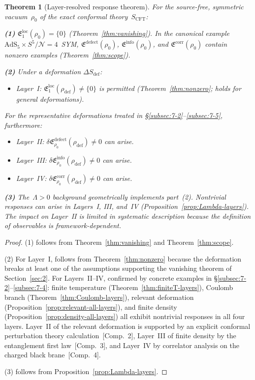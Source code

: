 \documentclass[
  aps,
  prd,
  preprint,
  groupedaddress,
  nofootinbib,
  longbibliography
]{revtex4-2}
\newtheorem{theorem}[definition]{Theorem}
\theoremstyle{remark}
\newcommand{\N}{\mathcal{N}}
\newcommand{\AdS}{\mathrm{AdS}}
\begin{document}
\begin{theorem}[Layer-resolved response theorem]%
  \label{thm:layer-response}
For the source-free, symmetric vacuum~$\rho_0$ of the exact
conformal theory~$S_{\mathrm{CFT}}$:

\textbf{(1)}
$\mathfrak{E}_1^{\mathrm{loc}}(\rho_0)=\{0\}$
(Theorem~\ref{thm:vanishing}).
In the canonical
example~$\AdS_5\times S^5/\N=4$~SYM,
$\mathfrak{E}^{\mathrm{defect}}(\rho_0)$,
$\mathfrak{E}^{\mathrm{info}}(\rho_0)$, and
$\mathfrak{E}^{\mathrm{corr}}(\rho_0)$ contain nonzero examples
(Theorem~\ref{thm:scope}).

\textbf{(2)} Under a deformation
$\Delta S_{\mathrm{def}}$:
\begin{itemize}
\item Layer~I:
  $\mathfrak{E}_1^{\mathrm{loc}}(\rho_{\mathrm{def}})
  \neq\{0\}$ is permitted
  (Theorem~\ref{thm:nonzero}; holds for general deformations).
\end{itemize}
For the representative deformations treated in
\S\ref{subsec:7-2}--\ref{subsec:7-5}, furthermore:
\begin{itemize}
\item Layer~II:
  $\delta\mathfrak{E}_{\rho_0}^{\mathrm{defect}}%
  (\rho_{\mathrm{def}})\neq 0$ can arise.
\item Layer~III:
  $\delta\mathfrak{E}_{\rho_0}^{\mathrm{info}}%
  (\rho_{\mathrm{def}})\neq 0$ can arise.
\item Layer~IV:
  $\delta\mathfrak{E}_{\rho_0}^{\mathrm{corr}}%
  (\rho_{\mathrm{def}})\neq 0$ can arise.
\end{itemize}

\textbf{(3)} The~$\Lambda>0$ background geometrically implements
part~(2).
Nontrivial responses can arise in Layers~I, III, and~IV
(Proposition~\ref{prop:Lambda-layers}).
The impact on Layer~II is limited in systematic description
because the definition of observables is framework-dependent.
\end{theorem}

\begin{proof}
(1) follows from Theorem~\ref{thm:vanishing} and
Theorem~\ref{thm:scope}.

(2) For Layer~I, follows from Theorem~\ref{thm:nonzero}
because the deformation breaks at least one of the assumptions
supporting the vanishing theorem of Section~\ref{sec:2}.
For Layers~II--IV, confirmed by concrete examples in
\S\ref{subsec:7-2}--\ref{subsec:7-4}:
finite temperature
(Theorem~\ref{thm:finiteT-layers}),
Coulomb branch
(Theorem~\ref{thm:Coulomb-layers}),
relevant deformation
(Proposition~\ref{prop:relevant-all-layers}),
and finite density
(Proposition~\ref{prop:density-all-layers})
all exhibit nontrivial responses in all four layers.
Layer~II of the relevant deformation is supported by an
explicit conformal perturbation theory
calculation~[Comp.~2],
Layer~III of finite density by the entanglement first
law~[Comp.~3],
and Layer~IV by correlator analysis on the charged black
brane~[Comp.~4].

(3) follows from Proposition~\ref{prop:Lambda-layers}.
\end{proof}
\end{document}
